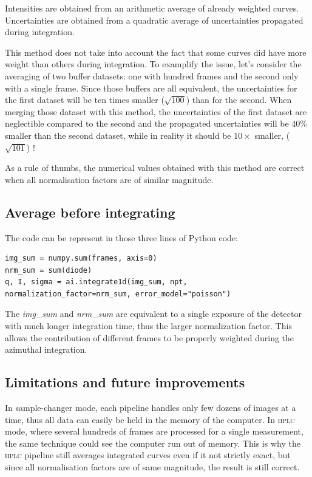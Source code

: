 \documentclass[preprint]{iucr}              %
\begin{document}
Intensities are obtained from an arithmetic average of already weighted curves.
Uncertainties are obtained from a quadratic average of uncertainties propagated during integration. 

This method does not take into account the fact that some curves did have more weight than others during integration.
To examplify the issue, let's consider the averaging of two buffer datasets: one with hundred frames and the second only with a single frame.
Since those buffers are all equivalent, the uncertainties for the first dataset will be ten times smaller ($\sqrt{100}$) than for the second.
When merging those dataset with this method, the uncertainties of the first dataset are neglectible compared to the second and the propagated uncertainties will be 40\% smaller than the second dataset, while in reality it should be $10\times$ smaller, ($\sqrt{101}$) ! 

As a rule of thumbs, the numerical values obtained with this method are correct when all normalisation factors are of similar magnitude.

\subsection{Average before integrating}
The code can be represent in those three lines of Python code:
\begin{verbatim} 
img_sum = numpy.sum(frames, axis=0)
nrm_sum = sum(diode)
q, I, sigma = ai.integrate1d(img_sum, npt, normalization_factor=nrm_sum, error_model="poisson")
\end{verbatim}

The \textit{img\_sum} and \textit{nrm\_sum} are equivalent to a single exposure of the detector with much longer integration time, thus the larger normalization factor. 
This allows the contribution of different frames to be properly weighted during the azimuthal integration. 


\subsection{Limitations and future improvements}
In sample-changer mode, each pipeline handles only few dozens of images at a time, thus all data can easily be held in the memory of the computer.
In \textsc{hplc} mode, where several hundreds of frames are processed for a single measurement, the same technique could see the computer run out of memory.
This is why the \textsc{hplc} pipeline still averages integrated curves even if it not strictly exact, but since all normalisation factors are of same magnitude, the result is still correct.  
\end{document}

